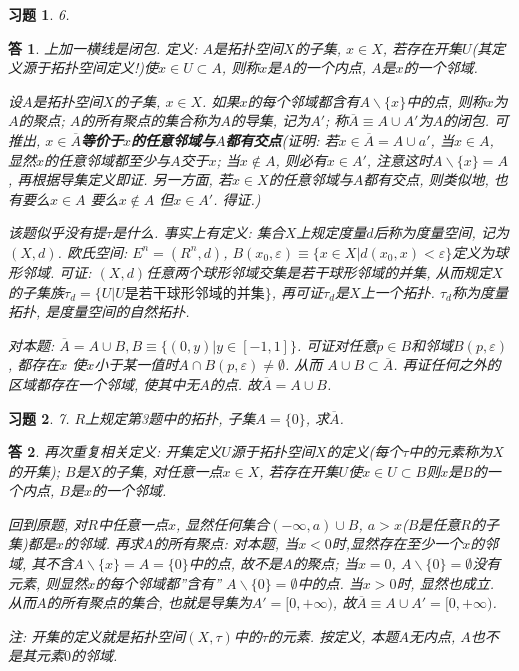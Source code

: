 \documentclass{ctexart}%
\newtheorem*{exercise}{习题}
\newtheorem*{solution}{答}
\theoremstyle{definition}
\theoremstyle{remark}
\begin{document}
\begin{exercise}6.
\end{exercise}
\begin{solution}上加一横线是闭包. 定义: $A$是拓扑空间$X$的子集, $x\in X$, 若存在开集$U$(其定义源于拓扑空间定义!)使$x\in U \subset A$, 则称$x$是$A$的一个内点, $A$是$x$的一个邻域. 

设$A$是拓扑空间$X$的子集, $x\in X$. 如果$x$的每个邻域都含有$A\backslash \{x\}$中的点, 则称$x$为$A$的聚点; $A$的所有聚点的集合称为$A$的导集, 记为$A'$; 称$\overline{A}\equiv A\cup A'$为$A$的闭包. 可推出, \textbf{$x\in \overline{A}$等价于$x$的任意邻域与$A$都有交点}(证明: 若$x\in \overline{A}=A\cup a'$, 当$x\in A$, 显然$x$的任意邻域都至少与$A$交于$x$; 当$x\notin A$, 则必有$x\in A'$, 注意这时$A\backslash \{x\}=A$, 再根据导集定义即证. 另一方面, 若$x\in X$的任意邻域与$A$都有交点, 则类似地, 也有要么$x\in A$ 要么$x \notin A$ 但$x\in A'$. 得证.)

该题似乎没有提$\tau$是什么. 事实上有定义: 集合$X$上规定度量$d$后称为度量空间, 记为$(X,d)$. 欧氏空间: $E^n=(R^n,d)$, $B(x_0,\varepsilon)\equiv\{x\in X|d(x_0,x)<\varepsilon\}$定义为球形邻域. 可证: $(X,d)$任意两个球形邻域交集是若干球形邻域的并集, 从而规定$X$的子集族$\tau_d=\{U|U\text{是若干球形邻域的并集}\}$, 再可证$\tau_d$是$X$上一个拓扑. $\tau_d$称为度量拓扑, 是度量空间的自然拓扑. 

对本题: $\overline{A}=A\cup B, B\equiv \{(0,y)|y\in [-1,1]\}$. 可证对任意$p\in B$和邻域$B(p,\varepsilon)$, 都存在$x$ 使$x$小于某一值时$A\cap B(p,\varepsilon)\neq \emptyset$. 从而 $A\cup B \subset \overline{A}$. 再证任何之外的区域都存在一个邻域, 使其中无$A$的点. 故$\overline{A}=A\cup B$. 
\end{solution}

\begin{exercise}7. $R$上规定第3题中的拓扑, 子集$A=\{0\}$, 求$\overline{A}$.
\end{exercise}
\begin{solution}再次重复相关定义: 开集定义$U$源于拓扑空间$X$的定义(每个$\tau$中的元素称为$X$的开集); $B$是$X$的子集, 对任意一点$x\in X$, 若存在开集$U$使$x\in U\subset B$则$x$是$B$的一个内点, $B$是$x$的一个邻域. 

回到原题, 对$R$中任意一点$x$, 显然任何集合$(-\infty, a)\cup B$, $a>x$($B$是任意$R$的子集)都是$x$的邻域. 再求$A$的所有聚点: 对本题, 当$x<0$时,显然存在至少一个$x$的邻域, 其不含$A\backslash\{x\}=A=\{0\}$中的点, 故不是$A$的聚点; 当$x=0$, $A\backslash \{0\}=\emptyset$没有元素, 则显然$x$的每个邻域都''含有'' $A\backslash \{0\}=\emptyset$中的点. 当$x>0$时, 显然也成立. 从而$A$的所有聚点的集合, 也就是导集为$A'=[0,+\infty)$, 故$\overline{A}\equiv A\cup A'=[0,+\infty)$. 

注: 开集的定义就是拓扑空间$(X,\tau)$中的$\tau$的元素. 按定义, 本题$A$无内点, $A$也不是其元素$0$的邻域.
\end{solution}
\end{document}
